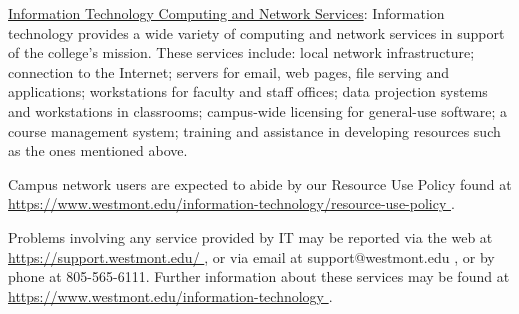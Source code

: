 		\underline{Information Technology Computing and Network Services}:  Information technology provides a wide variety of computing and network services in support of the college's mission.  These services include:  local network infrastructure; connection to the Internet; servers for email, web pages, file serving and applications; workstations for faculty and staff offices; data projection systems and workstations in classrooms; campus-wide licensing for general-use software; a course management system; training and assistance in developing resources such as the ones mentioned above.

		Campus network users are expected to abide by our Resource Use Policy found at
		\href{
			https://www.westmont.edu/information-technology/resource-use-policy
		}{\url{
				https://www.westmont.edu/information-technology/resource-use-policy
			}}
		.

		Problems involving any service provided by IT may be reported via the web at
		\href{
			https://support.westmont.edu/
		}{\url{
				https://support.westmont.edu/
			}}
		,
		or via email at support@westmont.edu
		,
		or by phone at 805-565-6111.  Further information about these services may be found at
		\href{
			https://www.westmont.edu/information-technology
		}{\url{
				https://www.westmont.edu/information-technology
			}}
		.
